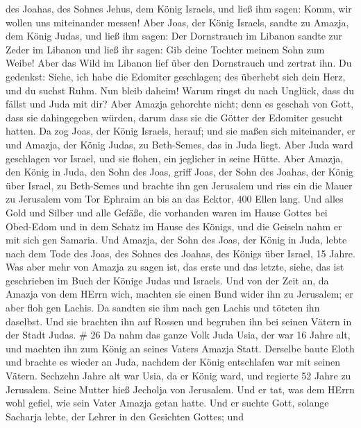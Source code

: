 des Joahas, des Sohnes Jehus, dem König Israels, und ließ ihm sagen:
Komm, wir wollen uns miteinander messen!  Aber Joas, der
König Israels, sandte zu Amazja, dem König Judas, und ließ ihm sagen:
Der Dornstrauch im Libanon sandte zur Zeder im Libanon und ließ ihr
sagen: Gib deine Tochter meinem Sohn zum Weibe! Aber das Wild im Libanon
lief über den Dornstrauch und zertrat ihn.  Du gedenkst:
Siehe, ich habe die Edomiter geschlagen; des überhebt sich dein Herz,
und du suchst Ruhm. Nun bleib daheim! Warum ringst du nach Unglück, dass
du fällst und Juda mit dir?  Aber Amazja gehorchte nicht;
denn es geschah von Gott, dass sie dahingegeben würden, darum dass sie
die Götter der Edomiter gesucht hatten.  Da zog Joas, der
König Israels, herauf; und sie maßen sich miteinander, er und Amazja,
der König Judas, zu Beth-Semes, das in Juda liegt.  Aber
Juda ward geschlagen vor Israel, und sie flohen, ein jeglicher in seine
Hütte.  Aber Amazja, den König in Juda, den Sohn des Joas,
griff Joas, der Sohn des Joahas, der König über Israel, zu Beth-Semes
und brachte ihn gen Jerusalem und riss ein die Mauer zu Jerusalem vom
Tor Ephraim an bis an das Ecktor, 400 Ellen lang.  Und
alles Gold und Silber und alle Gefäße, die vorhanden waren im Hause
Gottes bei Obed-Edom und in dem Schatz im Hause des Königs, und die
Geiseln nahm er mit sich gen Samaria.  Und Amazja, der Sohn
des Joas, der König in Juda, lebte nach dem Tode des Joas, des Sohnes
des Joahas, des Königs über Israel, 15 Jahre.  Was aber
mehr von Amazja zu sagen ist, das erste und das letzte, siehe, das ist
geschrieben im Buch der Könige Judas und Israels.  Und von
der Zeit an, da Amazja von dem HErrn wich, machten sie einen Bund wider
ihn zu Jerusalem; er aber floh gen Lachis. Da sandten sie ihm nach gen
Lachis und töteten ihn daselbst.  Und sie brachten ihn auf
Rossen und begruben ihn bei seinen Vätern in der Stadt Judas. \# 26
 Da nahm das ganze Volk Juda Usia, der war 16 Jahre alt, und
machten ihn zum König an seines Vaters Amazja Statt. 
Derselbe baute Eloth und brachte es wieder an Juda, nachdem der König
entschlafen war mit seinen Vätern.  Sechzehn Jahre alt war
Usia, da er König ward, und regierte 52 Jahre zu Jerusalem. Seine Mutter
hieß Jecholja von Jerusalem.  Und er tat, was dem HErrn wohl
gefiel, wie sein Vater Amazja getan hatte.  Und er suchte
Gott, solange Sacharja lebte, der Lehrer in den Gesichten Gottes; und
